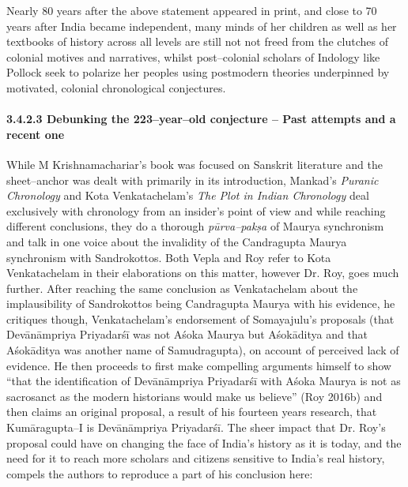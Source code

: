 Nearly 80 years after the above statement appeared in print, and close to 70 years after India became independent, many minds of her children as well as her textbooks of history across all levels are still not not freed from the clutches of colonial motives and narratives, whilst post–colonial scholars of Indology like Pollock seek to polarize her peoples using postmodern theories underpinned by motivated, colonial chronological conjectures.


\paragraph*{3.4.2.3 Debunking the 223–year–old conjecture – Past attempts and a recent one}

While M Krishnamachariar’s book was focused on Sanskrit literature and the sheet–anchor was dealt with primarily in its introduction, Mankad’s \textit{Puranic Chronology} and Kota Venkatachelam’s \textit{The Plot in Indian Chronology} deal exclusively with chronology from an insider’s point of view and while reaching different conclusions, they do a thorough \textit{pūrva–pakṣa} of Maurya synchronism and talk in one voice about the invalidity of the Candragupta Maurya synchronism with Sandrokottos. Both Vepla and Roy refer to Kota Venkatachelam in their elaborations on this matter, however Dr. Roy, goes much further. After reaching the same conclusion as Venkatachelam about the implausibility of Sandrokottos being Candragupta Maurya with his evidence, he critiques though, Venkatachelam’s endorsement of Somayajulu’s proposals (that Devānāmpriya Priyadarśī was not Aśoka Maurya but Aśokāditya and that Aśokāditya was another name of Samudragupta), on account of perceived lack of evidence. He then proceeds to first make compelling arguments himself to show “that the identification of Devānāmpriya Priyadarśī with Aśoka Maurya is not as sacrosanct as the modern historians would make us believe” (Roy 2016b) and then claims an original proposal, a result of his fourteen years research, that Kumāragupta–I is Devānāmpriya Priyadarśī. The sheer impact that Dr. Roy’s proposal could have on changing the face of India’s history as it is today, and the need for it to reach more scholars and citizens sensitive to India’s real history, compels the authors to reproduce a part of his conclusion here:

